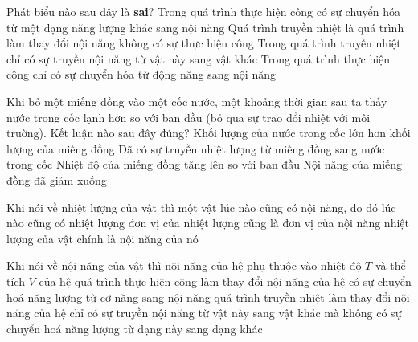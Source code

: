 \begin{ex} 
	Phát biểu nào sau đây là \textbf{sai}?
	\choice
	{Trong quá trình thực hiện công có sự chuyển hóa từ một dạng năng lượng khác sang nội năng}
	{Quá trình truyền nhiệt là quá trình làm thay đổi nội năng không có sự thực hiện công}
	{Trong quá trình truyền nhiệt chỉ có sự truyền nội năng từ vật này sang vật khác}
	{\True Trong quá trình thực hiện công chỉ có sự chuyển hóa từ động năng sang nội năng}
\end{ex}

\begin{ex} 
	Khi bỏ một miếng đồng vào một cốc nước, một khoảng thời gian sau ta thấy nước trong cốc lạnh hơn so với ban đầu (bỏ qua sự trao đổi nhiệt với môi truờng). Kết luận nào sau đây đúng?
	\choice
	{Khối lượng của nước trong cốc lớn hơn khối lượng của miếng đồng}
	{Đã có sự truyền nhiệt lượng từ miếng đồng sang nước trong cốc}
	{\True Nhiệt độ của miếng đồng tăng lên so với ban đầu}
	{Nội năng của miếng đồng đã giảm xuống}
\end{ex}

\begin{ex}
	Khi nói về nhiệt lượng của vật thì
	{một vật lúc nào cũng có nội năng, do đó lúc nào cũng có nhiệt lượng}
	{\True đơn vị của nhiệt lượng cũng là đơn vị của nội năng}
	{nhiệt lượng của vật chính là nội năng của nó}
	
	\end{ex}

\begin{ex}
	Khi nói về nội năng của vật thì
	{\True nội năng của hệ phụ thuộc vào nhiệt độ $T$ và thể tích $V$ của hệ}
	{\True quá trình thực hiện công làm thay đổi nội năng của hệ có sự chuyển hoá năng lượng từ cơ năng sang nội năng}
	{\True quá trình truyền nhiệt làm thay đổi nội năng của hệ chỉ có sự truyền nội năng từ vật này sang vật khác mà không có sự chuyển hoá năng lượng từ dạng này sang dạng khác}
	\end{ex}

